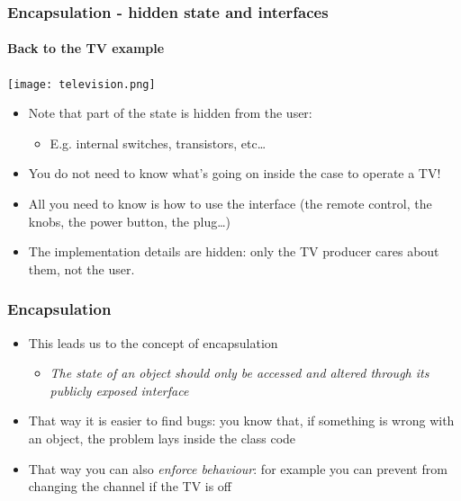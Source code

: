 \documentclass[9pt]{beamer}
\begin{document}
\begin{frame}
  \frametitle{Encapsulation - hidden state and interfaces}
  \framesubtitle{Back to the TV example}
  
  \centering\texttt{[image: television.png]}
  
  \bigskip
  
  \begin{itemize}
  \item Note that part of the state is hidden from the user:
    \begin{itemize}
    \item E.g. internal switches, transistors, etc\dots
    \end{itemize}
  \smallskip
  \item You do not need to know what's going on inside the case to operate a TV!
  \smallskip
  \item All you need to know is how to use the \alert{interface} (the remote
        control, the knobs, the power button, the plug\dots)
  \smallskip
  \item The \alert{implementation} details are hidden: only the TV producer cares about
        them, not the user. 
  \end{itemize}

\end{frame}


\begin{frame}
  \frametitle{Encapsulation}
  
  \begin{itemize}
    \item This leads us to the concept of \alert{encapsulation} 
    \bigskip
    \begin{itemize}
      \item \emph{The state of an object should only be accessed and altered
                  through its publicly exposed interface}
    \end{itemize}
    \bigskip
    \item That way it is easier to find bugs: you know that, if something is wrong
          with an object, the problem lays inside the class code
    \bigskip
    \item That way you can also \emph{enforce behaviour}: for example you can
          prevent from changing the channel if the TV is off
    
  \end{itemize}

\end{frame}
\end{document}
